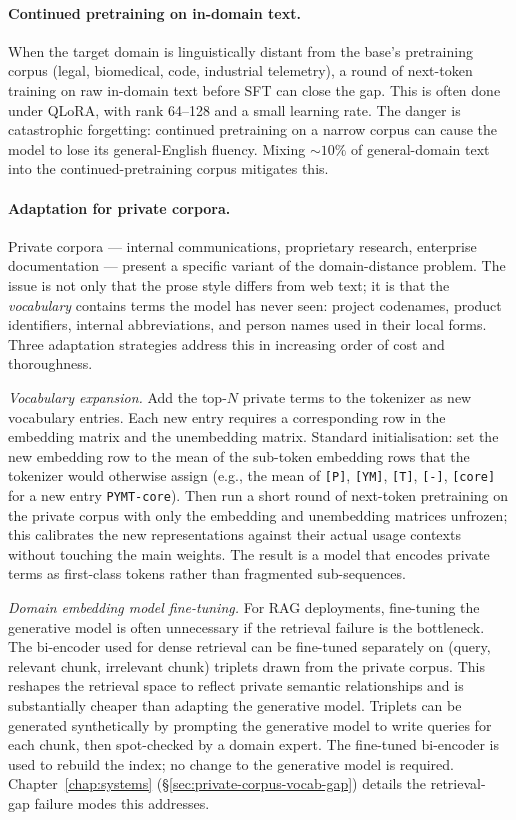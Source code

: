 \paragraph{Continued pretraining on in-domain text.} When the target
domain is linguistically distant from the base's pretraining corpus
(legal, biomedical, code, industrial telemetry), a round of
next-token training on raw in-domain text before SFT can close the
gap. This is often done under QLoRA, with rank 64--128 and a small
learning rate. The danger is catastrophic forgetting: continued
pretraining on a narrow corpus can cause the model to lose its
general-English fluency. Mixing $\sim 10\%$ of general-domain text
into the continued-pretraining corpus mitigates this.

\paragraph{Adaptation for private corpora.}
\label{sec:ch8_private_vocab}
Private corpora --- internal communications, proprietary
research, enterprise documentation --- present a specific
variant of the domain-distance problem. The issue is not only
that the prose style differs from web text; it is that the
\emph{vocabulary} contains terms the model has never seen:
project codenames, product identifiers, internal abbreviations,
and person names used in their local forms. Three adaptation
strategies address this in increasing order of cost and
thoroughness.

\emph{Vocabulary expansion.} Add the top-$N$ private terms to
the tokenizer as new vocabulary entries. Each new entry requires
a corresponding row in the embedding matrix and the unembedding
matrix. Standard initialisation: set the new embedding row to
the mean of the sub-token embedding rows that the tokenizer
would otherwise assign (e.g., the mean of \texttt{[P]},
\texttt{[YM]}, \texttt{[T]}, \texttt{[-]}, \texttt{[core]} for
a new entry \texttt{PYMT-core}). Then run a short round of
next-token pretraining on the private corpus with only the
embedding and unembedding matrices unfrozen; this calibrates
the new representations against their actual usage contexts
without touching the main weights. The result is a model that
encodes private terms as first-class tokens rather than
fragmented sub-sequences.

\emph{Domain embedding model fine-tuning.} For RAG deployments,
fine-tuning the generative model is often unnecessary if the
retrieval failure is the bottleneck. The bi-encoder used for
dense retrieval can be fine-tuned separately on
(query, relevant chunk, irrelevant chunk) triplets drawn from
the private corpus. This reshapes the retrieval space to reflect
private semantic relationships and is substantially cheaper than
adapting the generative model. Triplets can be generated
synthetically by prompting the generative model to write queries
for each chunk, then spot-checked by a domain expert. The
fine-tuned bi-encoder is used to rebuild the index; no change
to the generative model is required. Chapter~\ref{chap:systems}
(\S\ref{sec:private-corpus-vocab-gap}) details the retrieval-
gap failure modes this addresses.

